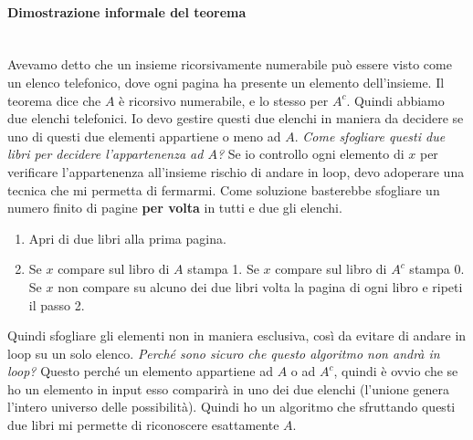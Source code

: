 \documentclass{article}
\begin{document}
\paragraph{Dimostrazione informale del teorema}\mbox{}\\
Avevamo detto che un insieme ricorsivamente numerabile può essere visto come
un elenco telefonico, dove ogni pagina ha presente un elemento dell'insieme.
Il teorema dice che $A$ è ricorsivo numerabile, e lo stesso per $A^c$. Quindi abbiamo
due elenchi telefonici. Io devo gestire questi due elenchi in maniera da decidere
se uno di questi due elementi appartiene o meno ad $A$. \textit{Come sfogliare
    questi due libri per decidere l'appartenenza ad $A$?} Se io controllo ogni elemento
di $x$ per verificare l'appartenenza all'insieme rischio di andare in loop, devo
adoperare una tecnica che mi permetta di fermarmi. Come soluzione basterebbe sfogliare
un numero finito di pagine \textbf{per volta} in tutti e due gli elenchi.
\begin{enumerate}
    \item Apri di due libri alla prima pagina.
    \item Se $x$ compare sul libro di $A$ stampa 1. Se $x$ compare sul libro di $A^c$
          stampa 0. Se $x$ non compare su alcuno dei due libri volta la pagina di ogni libro
          e ripeti il passo 2.
\end{enumerate}
Quindi sfogliare gli elementi non in maniera esclusiva, così da evitare di andare
in loop su un solo elenco. \textit{Perché sono sicuro che questo algoritmo non
    andrà in loop?} Questo perché un elemento appartiene ad $A$ o ad $A^c$, quindi
è ovvio che se ho un elemento in input esso comparirà in uno dei due elenchi (l'unione
genera l'intero universo delle possibilità).
Quindi ho un algoritmo che sfruttando questi due libri mi permette di riconoscere
esattamente $A$.
\end{document}
